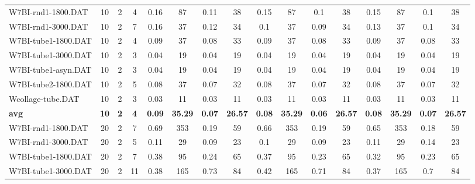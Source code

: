 \begin{sidewaystable}[!ht]
{\begin{tabular}{lccccccccccccccc}
W7BI-rnd1-1800.DAT & 10 & 2 & 4 & 0.16 & 87 & 0.11 & 38 & 0.15 & 87 &  \textcolor{blue2}{0.1} & 38 & 0.15 & 87 &  \textcolor{blue2}{0.1} & 38 \\
W7BI-rnd1-3000.DAT & 10 & 2 & 7 & 0.16 & 37 & 0.12 & 34 & 0.1 & 37 &  \textcolor{blue2}{0.09} & 34 & 0.13 & 37 & 0.1 & 34 \\
W7BI-tube1-1800.DAT & 10 & 2 & 4 & 0.09 & 37 &  \textcolor{blue2}{0.08} & 33 & 0.09 & 37 &  \textcolor{blue2}{0.08} & 33 & 0.09 & 37 &  \textcolor{blue2}{0.08} & 33 \\
W7BI-tube1-3000.DAT & 10 & 2 & 3 &  \textcolor{blue2}{0.04} & 19 &  \textcolor{blue2}{0.04} & 19 &  \textcolor{blue2}{0.04} & 19 &  \textcolor{blue2}{0.04} & 19 &  \textcolor{blue2}{0.04} & 19 &  \textcolor{blue2}{0.04} & 19 \\
W7BI-tube1-asyn.DAT & 10 & 2 & 3 &  \textcolor{blue2}{0.04} & 19 &  \textcolor{blue2}{0.04} & 19 &  \textcolor{blue2}{0.04} & 19 &  \textcolor{blue2}{0.04} & 19 &  \textcolor{blue2}{0.04} & 19 &  \textcolor{blue2}{0.04} & 19 \\
W7BI-tube2-1800.DAT & 10 & 2 & 5 & 0.08 & 37 &  \textcolor{blue2}{0.07} & 32 & 0.08 & 37 &  \textcolor{blue2}{0.07} & 32 & 0.08 & 37 &  \textcolor{blue2}{0.07} & 32 \\
Wcollage-tube.DAT & 10 & 2 & 3 &  \textcolor{blue2}{0.03} & 11 &  \textcolor{blue2}{0.03} & 11 &  \textcolor{blue2}{0.03} & 11 &  \textcolor{blue2}{0.03} & 11 &  \textcolor{blue2}{0.03} & 11 &  \textcolor{blue2}{0.03} & 11 \\
\cline{1-16} \textbf{avg} & \textbf{10} & \textbf{2} & \textbf{4} & \textbf{0.09} & \textbf{35.29} & \textbf{0.07} & \textbf{26.57} & \textbf{0.08} & \textbf{35.29} & \textbf{0.06} & \textbf{26.57} & \textbf{0.08} & \textbf{35.29} & \textbf{0.07} & \textbf{26.57} \\ \cline{1-16}
W7BI-rnd1-1800.DAT & 20 & 2 & 7 & 0.69 & 353 & 0.19 & 59 & 0.66 & 353 & 0.19 & 59 & 0.65 & 353 &  \textcolor{blue2}{0.18} & 59 \\
W7BI-rnd1-3000.DAT & 20 & 2 & 5 & 0.11 & 29 &  \textcolor{blue2}{0.09} & 23 & 0.1 & 29 &  \textcolor{blue2}{0.09} & 23 & 0.11 & 29 & 0.14 & 23 \\
W7BI-tube1-1800.DAT & 20 & 2 & 7 & 0.38 & 95 & 0.24 & 65 & 0.37 & 95 &  \textcolor{blue2}{0.23} & 65 & 0.32 & 95 &  \textcolor{blue2}{0.23} & 65 \\
W7BI-tube1-3000.DAT & 20 & 2 & 11 & 0.38 & 165 & 0.73 & 84 & 0.42 & 165 & 0.71 & 84 &  \textcolor{blue2}{0.37} & 165 & 0.7 & 84 \\

\end{tabular}}
\end{sidewaystable}
